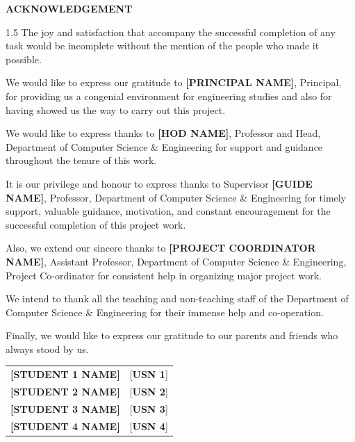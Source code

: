 \documentclass[../Project-Report-Main.tex]{subfiles}
\begin{document}
\thispagestyle{plain}

\begin{center}
\textbf{\Large ACKNOWLEDGEMENT}
\end{center}

\vspace{0.3in}

\begin{spacing}{1.5}
\noindent The joy and satisfaction that accompany the successful completion of any task would be incomplete without the mention of the people who made it possible.

\bigskip

\noindent We would like to express our gratitude to \textbf{[PRINCIPAL NAME]}, Principal, for providing us a congenial environment for engineering studies and also for having showed us the way to carry out this project.
	
\bigskip

\noindent We would like to express thanks to \textbf{[HOD NAME]}, Professor and Head, Department of Computer Science \& Engineering for support and guidance throughout the tenure of this work.

\bigskip

\noindent It is our privilege and honour to express thanks to Supervisor \textbf{[GUIDE NAME]}, Professor, Department of Computer Science \& Engineering for timely support, valuable guidance, motivation, and constant encouragement for the successful completion of this project work.

\bigskip

\noindent Also, we extend our sincere thanks to \textbf{[PROJECT COORDINATOR NAME]}, Assistant Professor, Department of Computer Science \& Engineering, Project Co-ordinator for consistent help in organizing major project work.

\bigskip

\noindent We intend to thank all the teaching and non-teaching staff of the Department of Computer Science \& Engineering for their immense help and co-operation.

\bigskip

\noindent Finally, we would like to express our gratitude to our parents and friends who always stood by us.
\end{spacing}

\begin{table}[ht]
\begin{tabular}{p{2.5in} p{1.5in}}
\textbf{[STUDENT 1 NAME]} & [\textbf{USN 1}] \\
\textbf{[STUDENT 2 NAME]} & [\textbf{USN 2}] \\
\textbf{[STUDENT 3 NAME]} & [\textbf{USN 3}] \\
\textbf{[STUDENT 4 NAME]} & [\textbf{USN 4}] \\
\end{tabular}
\end{table}
\end{document}
